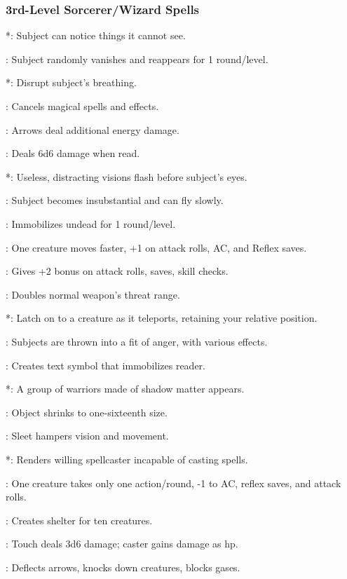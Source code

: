 \subsubsection{3rd-Level Sorcerer/Wizard Spells}
\begin{list}{}{\leftmargin=1em}
\item {}*: Subject can notice things it cannot see.
\item {}: Subject randomly vanishes and reappears for 1 round/level.
\item {}*: Disrupt subject's breathing.
\item {}: Cancels magical spells and effects.
\item {}: Arrows deal additional energy damage.
\item {}: Deals 6d6 damage when read.
\item {}*: Useless, distracting visions flash before subject's eyes.
\item {}: Subject becomes insubstantial and can fly slowly.
\item {}: Immobilizes undead for 1 round/level.
\item {}: One creature moves faster, +1 on attack rolls, AC, and Reflex saves.
\item {}: Gives +2 bonus on attack rolls, saves, skill checks.
\item {}: Doubles normal weapon's threat range.
\item {}*: Latch on to a creature as it teleports, retaining your relative position.
\item {}: Subjects are thrown into a fit of anger, with various effects.
\item {}: Creates text symbol that immobilizes reader.
\item {}*: A group of warriors made of shadow matter appears.
\item {}: Object shrinks to one-sixteenth size.
\item {}: Sleet hampers vision and movement.
\item {}*: Renders willing spellcaster incapable of casting spells.
\item {}: One creature takes only one action/round, -1 to AC, reflex saves, and attack rolls.
\item {}: Creates shelter for ten creatures.
\item {}: Touch deals 3d6 damage; caster gains damage as hp.
\item {}: Deflects arrows, knocks down creatures, blocks gases.
\end{list}
